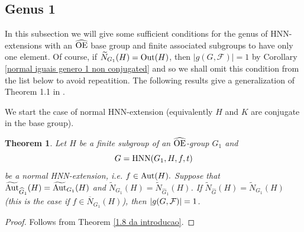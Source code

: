 \documentclass[a4paper,12pt]{article}
\newtheorem{thm}{Theorem}[section]
\newcommand{\Oe}{\rm \widehat{OE}}
\newcommand{\F}{{\cal F}}
\def\aut {{\rm Aut}}
\def\out {{\rm Out}}
\def\hnn {{\rm HNN}}
\begin{document}
{%

\subsection{Genus 1}

In this subsection we will give some sufficient conditions for  the genus of HNN-extensions with  an $\Oe$ base group and finite associated subgroups to have only one element. Of course, if  $\widetilde{N}_{G_1}(H)=\out(H)$, then $|g(G, \mathcal{F})| =1
$ by Corollary %
\ref{normal iguais genero 1 non conjugated} and so we shall omit this condition from the list  below to avoid repeatition. The following results give a generalization of Theorem 1.1 in \cite{BZ}. 


We start the case of normal HNN-extension (equivalently $H$ and $K$ are conjugate in the base group).

\begin{thm}\label{genus 1 normal}
Let $H$ be a finite subgroup of an $\Oe$-group $G_1$ and $$G=\hnn(G_1, H, f, t)$$ be a normal HNN-extension, i.e. $f \in \aut(H).$ 
Suppose that   $\widetilde{\aut}_{\widehat{G}_1}(H)=\widetilde{\aut}_{G_1}(H)$ and $\widetilde N_{G_1}(H)=\widetilde N_{\widehat G_1}(H)$. If $\widetilde{N}_{\widehat G}(H)=\widetilde{N}_{G_1}(H)$ (this is the case if $f\in \overline N_{G_1}(H)$), then $|g(G,\F)|=1$. 
\end{thm}
\begin{proof} Follows from Theorem \ref{1.8 da introducao}.
\end{proof}

}
\end{document}
